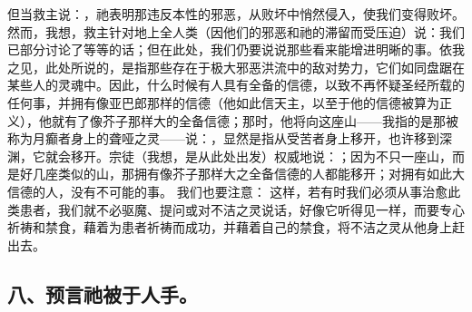 但当救主说：，祂表明那违反本性的邪恶，从败坏中悄然侵入，使我们变得败坏。然而，我想，救主针对地上全人类（因他们的邪恶和祂的滞留而受压迫）说：我们已部分讨论了等等的话；但在此处，我们仍要说说那些看来能增进明晰的事。依我之见，此处所说的，是指那些存在于极大邪恶洪流中的敌对势力，它们如同盘踞在某些人的灵魂中。因此，什么时候有人具有全备的信德，以致不再怀疑圣经所载的任何事，并拥有像亚巴郎那样的信德（他如此信天主，以至于他的信德被算为正义），他就有了像芥子那样大的全备信德；那时，他将向这座山——我指的是那被称为月癫者身上的聋哑之灵——说：，显然是指从受苦者身上移开，也许移到深渊，它就会移开。宗徒（我想，是从此处出发）权威地说：；因为不只一座山，而是好几座类似的山，那拥有像芥子那样大之全备信德的人都能移开；对拥有如此大信德的人，没有不可能的事。 我们也要注意： 这样，若有时我们必须从事治愈此类患者，我们就不必驱魔、提问或对不洁之灵说话，好像它听得见一样，而要专心祈祷和禁食，藉着为患者祈祷而成功，并藉着自己的禁食，将不洁之灵从他身上赶出去。\par


\subsection{八、预言祂被于人手。}

